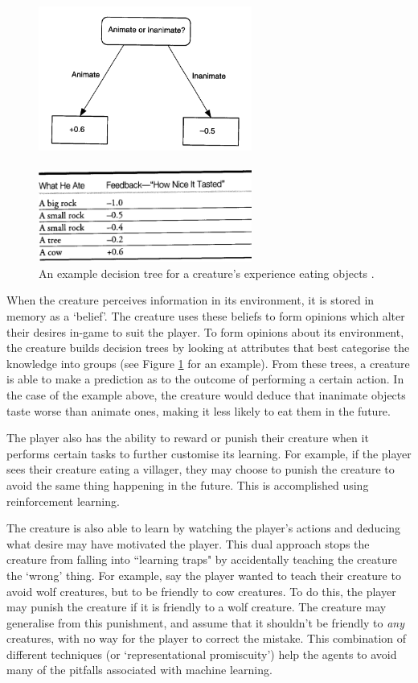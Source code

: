 \documentclass[a4paper,oneside]{report}
\begin{document}
\begin{figure}
	\centering
		\includegraphics[width=70mm]{sources/images/TastyTree}\paragraph{}
    	\includegraphics[width=70mm]{sources/images/TastyTable}
    	\caption{An example decision tree for a creature's experience eating objects \cite{:hc}.}
    	\label{fig:TastyTree}
\end{figure}

\noindent When the creature perceives information in its environment, it is stored in memory as a `belief'. The creature uses these beliefs to form opinions which alter their desires in-game to suit the player. To form opinions about its environment, the creature builds decision trees by looking at attributes that best categorise the knowledge into groups (see Figure \ref{fig:TastyTree} for an example). From these trees, a creature is able to make a prediction as to the outcome of performing a certain action. In the case of the example above, the creature would deduce that inanimate objects taste worse than animate ones, making it less likely to eat them in the future. 

The player also has the ability to reward or punish their creature when it performs certain tasks to further customise its learning. For example, if the player sees their creature eating a villager, they may choose to punish the creature to avoid the same thing happening in the future. This is accomplished using reinforcement learning. 

The creature is also able to learn by watching the player's actions and deducing what desire may have motivated the player. This dual approach stops the creature from falling into ``learning traps" by accidentally teaching the creature the `wrong' thing. For example, say the player wanted to teach their creature to avoid wolf creatures, but to be friendly to cow creatures. To do this, the player may punish the creature if it is friendly to a wolf creature. The creature may generalise from this punishment, and assume that it shouldn't be friendly to \emph{any} creatures, with no way for the player to correct the mistake. This combination of different techniques (or `representational promiscuity') help the agents to avoid many of the pitfalls associated with machine learning.
\end{document}
